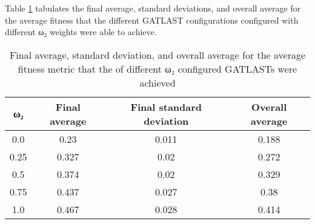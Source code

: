 Table \ref{tab:HP:GA:MWeight:average fitness} tabulates the final average, standard deviations, and overall average for the average fitness that the different GATLAST configurations configured with different ω₂ weights were able to achieve.
\begin{table}[tbh!]
\centering
\begin{adjustbox}{trim=0cm 0cm 0cm 0cm, clip=true}
\begin{tabular}{|c|c|c|c|}
\hline
ω₂ & Final average & Final standard deviation & Overall average\\
\hline
0.0 & 0.23 & 0.011 & 0.188\\\hline
0.25 & 0.327 & 0.02 & 0.272\\\hline
0.5 & 0.374 & 0.02 & 0.329\\\hline
0.75 & 0.437 & 0.027 & 0.38\\\hline
1.0 & 0.467 & 0.028 & 0.414\\\hline
\end{tabular}
\end{adjustbox}
\caption{Final average, standard deviation, and overall average for the average fitness metric that the of different ω₂ configured GATLASTs were achieved}
\label{tab:HP:GA:MWeight:average fitness}
\end{table}